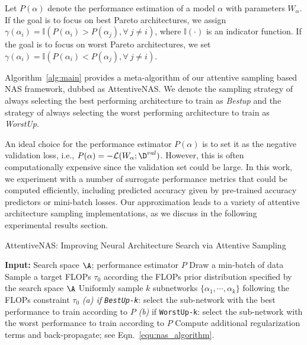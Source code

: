 \documentclass[final]{cvpr}
\theoremstyle{definition}
\begin{document}
Let $P(\alpha)$ denote the performance estimation of a model $\alpha$ with parameters $W_\alpha$.
If the goal is to focus on best {Pareto} architectures, 
we assign $\gamma(\alpha_i) = \mathbb{I}(P(\alpha_i) > P(\alpha_j), \forall~ j\neq i)$, where $\mathbb{I}(\cdot)$ is an indicator function. 
If the goal is to focus on worst {Pareto} architectures, 
we set $\gamma(\alpha_i) = \mathbb{I}(P(\alpha_i) < P(\alpha_j), \forall~ j\neq i)$. 

Algorithm~\ref{alg:main} provides a meta-algorithm of our attentive sampling based NAS framework, dubbed as {AttentiveNAS}. 
We denote the sampling strategy of always selecting the best performing architecture to train as \textit{Bestup} and the strategy of always selecting the worst performing architecture to train as \textit{WorstUp}.

An ideal choice for the performance estimator $P(\alpha)$ is to set it as the negative validation loss, i.e., $P(\alpha) = -\L(W_\alpha; \D^{val})$. 
However, this is often computationally expensive since the validation set could be large. 
In this work, 
we experiment with a number of surrogate performance metrics that could be computed efficiently,
including predicted accuracy given by pre-trained accuracy predictors or mini-batch losses.
Our approximation leads to a variety of attentive architecture sampling implementations, 
as we discuss in the following experimental results section.




\begin{algorithm}[t]
\caption{AttentiveNAS: Improving Neural Architecture Search via Attentive Sampling}
\label{alg:main}
\begin{algorithmic}[1]
    \STATE \textbf{Input:} Search space $\A$; performance estimator $P$
        \STATE Draw a min-batch of data
        \STATE Sample a target FLOPs $\tau_0$ according the FLOPs prior distribution specified by the search space $\A$
        \STATE Uniformly sample $k$ subnetworks $\{\alpha_1, \cdots, \alpha_k\}$ following the FLOPs constraint $\tau_0$ 
        \STATE \emph{(a) if \texttt{BestUp-k}}: select the sub-network with the best performance to train according to $P$
        \STATE \emph{(b)} if \texttt{WorstUp-k}: select the sub-network with the worst performance to train according to $P$
        \ENDFOR
        \STATE Compute additional regularization terms and back-propagate; see Eqn.~\eqref{equ:nas_algorithm}. 
    \ENDWHILE
\end{algorithmic}
\end{algorithm}
\end{document}
